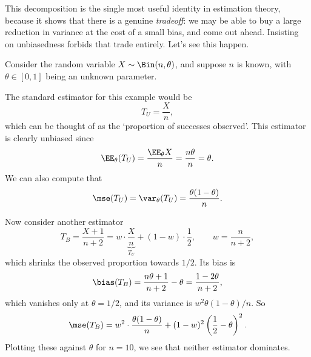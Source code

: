 This decomposition is the single most useful identity in estimation theory, because it shows that there is a genuine \emph{tradeoff}: we may be able to buy a large reduction in variance at the cost of a small bias, and come out ahead. Insisting on unbiasedness forbids that trade entirely. Let's see this happen.

\begin{example}
  Consider the random variable $X \sim \Bin(n, \theta)$, and suppose $n$ is known, with $\theta \in [0, 1]$ being an unknown parameter.

  The standard estimator for this example would be
  $$
  T_U = \frac{X}{n},
  $$
  which can be thought of as the `proportion of successes observed'.
  This estimator is clearly unbiased since
  $$
  \EE_\theta(T_U) = \frac{\EE_\theta{X}}{n} = \frac{n \theta}{n} = \theta.
  $$
  We can also compute that
  $$
  \mse(T_U) = \var_\theta(T_U) = \frac{\theta(1 - \theta)}{n}.
  $$

  Now consider another estimator
  $$
  T_B = \frac{X + 1}{n + 2} = w \cdot \underbrace{\frac{X}{n}}_{T_U} + (1 - w)\cdot\frac{1}{2}, \qquad w = \frac{n}{n+2},
  $$
  which shrinks the observed proportion towards $1/2$. Its bias is
  $$
  \bias(T_B) = \frac{n\theta + 1}{n+2} - \theta = \frac{1 - 2\theta}{n + 2},
  $$
  which vanishes only at $\theta = 1/2$, and its variance is $w^2\theta(1-\theta)/n$. So
  $$
  \mse(T_B) = w^2 \cdot \frac{\theta(1-\theta)}{n} + (1 - w)^2\left(\frac{1}{2} - \theta\right)^2.
  $$
  Plotting these against $\theta$ for $n = 10$, we see that neither estimator dominates.


\end{example}

